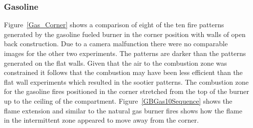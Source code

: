 \documentclass[twoside]{uocthesis}
\begin{document}
{\subsubsection{Gasoline}

Figure~\ref{Gas_Corner} shows a comparison of eight of the ten fire patterns generated by the gasoline fueled burner in the corner position with walls of open back construction. Due to a camera malfunction there were no comparable images for the other two experiments.  The patterns are darker than the patterns generated on the flat walls.  Given that the air to the combustion zone was constrained it follows that the combustion may have been less efficient than the flat wall experiments which resulted in the sootier patterns.  The combustion zone for the gasoline fires positioned in the corner stretched from the top of the burner up to the ceiling of the compartment.  Figure~\ref{GBGas10Sequence} shows the flame extension and similar to the natural gas burner fires shows how the flame in the intermittent zone appeared to move away from the corner.    

}
\end{document}
